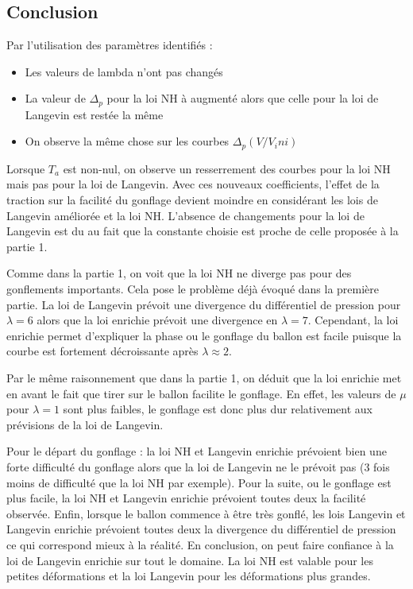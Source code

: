 \documentclass[a4paper,11pt]{article}
\begin{document}
\subsection{Conclusion}
Par l'utilisation des paramètres identifiés : 
\begin{itemize}
\item Les valeurs de lambda n'ont pas changés
\item La valeur de $\Delta_p$ pour la loi NH à augmenté alors que celle pour la loi de Langevin est restée la même
\item On observe la même chose sur les courbes $\Delta_p(V/V_ini)$
\end{itemize}

Lorsque $T_a$ est non-nul, on observe un resserrement des courbes pour la loi NH mais pas pour la loi de Langevin.
Avec ces nouveaux coefficients, l'effet de la traction sur la facilité du gonflage devient moindre en considérant les lois de Langevin améliorée et la loi NH. L'absence de changements pour la loi de Langevin est du au fait que la constante choisie est proche de celle proposée à la partie 1.

Comme dans la partie 1, on voit que la loi NH ne diverge pas pour des gonflements importants. Cela pose le problème déjà évoqué dans la première partie.
La loi de Langevin prévoit une divergence du différentiel de pression pour $\lambda=6$ alors que la loi enrichie prévoit une divergence en $\lambda=7$. Cependant, la loi enrichie permet d'expliquer la phase ou le gonflage du ballon est facile puisque la courbe est fortement décroissante après $\lambda \approx 2$.

Par le même raisonnement que dans la partie 1, on déduit que la loi enrichie met en avant le fait que tirer sur le ballon facilite le gonflage. En effet, les valeurs de $\mu$ pour $\lambda = 1$ sont plus faibles, le gonflage est donc plus dur relativement aux prévisions de la loi de Langevin.

Pour le départ du gonflage : la loi NH et Langevin enrichie prévoient bien une forte difficulté du gonflage alors que la loi de Langevin ne le prévoit pas (3 fois moins de difficulté que la loi NH par exemple).
Pour la suite, ou le gonflage est plus facile, la loi NH et Langevin enrichie prévoient toutes deux la facilité observée.
Enfin, lorsque le ballon commence à être très gonflé, les lois Langevin et Langevin enrichie prévoient toutes deux la divergence du différentiel de pression ce qui correspond mieux à la réalité.
En conclusion, on peut faire confiance à la loi de Langevin enrichie sur tout le domaine. La loi NH est valable pour les petites déformations et la loi Langevin pour les déformations plus grandes.
\end{document}
